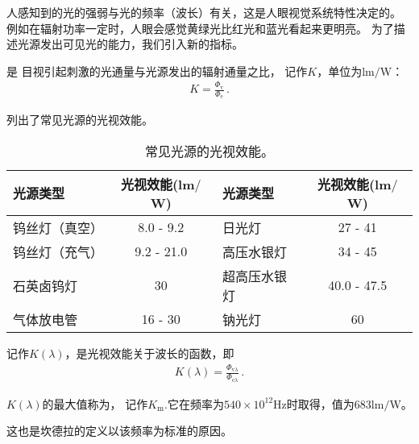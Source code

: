 人感知到的光的强弱与光的频率（波长）有关，这是人眼视觉系统特性决定的。
例如在辐射功率一定时，人眼会感觉黄绿光比红光和蓝光看起来更明亮。
为了描述光源发出可见光的能力，我们引入新的指标。

\begin{definition}
      是
      目视引起刺激的光通量与光源发出的辐射通量之比，
      记作$K$，单位为lm$/$W：
      \begin{align}
            K=\frac{\varPhi_{\mathrm{v}}}{\varPhi_{\mathrm{e}}}\, .
      \end{align}
\end{definition}

列出了常见光源的光视效能。
\begin{table}[htbp]
      \centering
      \begin{tabular}{lc|lc}
            \toprule
            \textbf{光源类型} & \textbf{光视效能(lm$/$W)} & \textbf{光源类型} & \textbf{光视效能(lm$/$W)} \\
            \midrule
            钨丝灯（真空）    & 8.0 - 9.2                 & 日光灯            & 27 - 41                   \\
            钨丝灯（充气）    & 9.2 - 21.0                & 高压水银灯        & 34 - 45                   \\
            石英卤钨灯        & 30                        & 超高压水银灯      & 40.0 - 47.5               \\
            气体放电管        & 16 - 30                   & 钠光灯            & 60                        \\
            \bottomrule
      \end{tabular}
      \caption{常见光源的光视效能。}
      \label{tab:5.ex01}
\end{table}

\begin{definition}
      记作$K(\lambda)$，是光视效能关于波长的函数，即
      \begin{align}
            K(\lambda)=\frac{\varPhi_{\mathrm{v}\lambda}}{\varPhi_{\mathrm{e}\lambda}}\, .
      \end{align}
\end{definition}

\begin{definition}
      $K(\lambda)$的最大值称为，
      记作$K_{\mathrm{m}}$.它在频率为$540\times10^{12}\text{Hz}$时取得，值为683lm$/$W。
\end{definition}
这也是坎德拉的定义以该频率为标准的原因。

